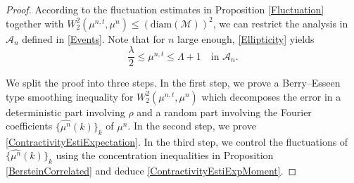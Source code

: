 \documentclass[11pt,a4paper,oneside]{amsart}
\numberwithin{equation}{section}
\begin{document}
 \begin{proof}
 According to the fluctuation estimates in Proposition \ref{Fluctuation} together with $W^2_2(\mu^{n,t},\mu^n)\leq (\text{diam}(\mathcal{M}))^2$, we can restrict the analysis in $\mathcal{A}_n$ defined in \eqref{Events}. Note that for $n$ large enough, \eqref{Ellipticity} yields
%
\begin{equation}\label{EllipticityAn}
%
\frac{\lambda}{2}\leq \mu^{n,t}\leq \Lambda+1\quad\text{in $\mathcal{A}_n$.}
%
\end{equation}
%

%
\medskip
%

We split the proof into three steps. In the first step, we prove a Berry–Esseen type smoothing inequality for $W^2_2(\mu^{n,t},\mu^n)$ which decomposes the error in a deterministic part involving $\rho$ and a random part involving the Fourier coefficients $\{\widehat{\mu^n}(k)\}_k$ of $\mu^n$. In the second step, we prove \eqref{ContractivityEstiExpectation}. In the third step, we control the fluctuations of $\{\widehat{\mu^n}(k)\}_k$ using the concentration inequalities in Proposition \ref{BersteinCorrelated} and deduce \eqref{ContractivityEstiExpMoment}.

%
\medskip
%


\end{proof}
\end{document}
